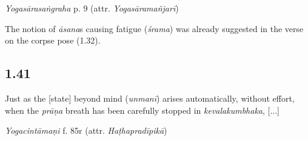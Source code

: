 \begin{ekdosis}
\begin{testimonia}[hp01_040]
\emph{Yogasārasaṅgraha} p. 9 (attr. \emph{Yogasāramañjarī})

\begin{versinnote}
\end{versinnote}

\end{testimonia}

\begin{philcomm}[hp01_040]






The notion of \emph{āsana}s causing fatigue (\emph{śrama}) was already suggested in the verse on the corpse pose (1.32).
\end{philcomm}


\subsection*{1.41}
\begin{translation}[hp01_041]
Just as the [state] beyond mind (\emph{unmanī}) arises automatically, without effort, when the \emph{prāṇa} breath has been carefully stopped in \emph{kevalakumbhaka}, [...]
\end{translation}


\begin{testimonia}[hp01_041]
\emph{Yogacintāmaṇi} f. 85r (attr. \emph{Haṭhapradīpikā})


\end{testimonia}
\end{ekdosis}
